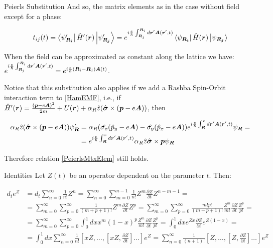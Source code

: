 \begin{subappendices}
\begin{section}{Peierls Substitution}
And so, the matrix elements as in the case without field except for a phase:

\begin{equation}
\label{PeierlsMtxElem}
t_{ij}(t) = \bra{\psi'_{\boldsymbol{R_i}}} \hat{H}'(\boldsymbol{r}) \ket{\psi'_{\boldsymbol{R_j}}} = e^{i\frac{e}{\hbar}\int_{\boldsymbol{R}_j}^{\boldsymbol{R}_i} d\boldsymbol{r}'\boldsymbol{A}(\boldsymbol{r}',t)} \bra{\psi_{\boldsymbol{R_i}}} \hat{H}(\boldsymbol{r}) \ket{\psi_{\boldsymbol{R_j}}}
\end{equation}

When the field can be approximated as constant along the lattice we have: $e^{i\frac{e}{\hbar}\int_{\boldsymbol{R}_j}^{\boldsymbol{R}_i} d\boldsymbol{r}'\boldsymbol{A}(\boldsymbol{r}',t)} = e^{i\frac{e}{\hbar} (\boldsymbol{R}_i-\boldsymbol{R}_j) \boldsymbol{A}(t)}$.

Notice that this substitution also applies if we add a Rashba Spin-Orbit interaction term to \ref{HamEMF}, i.e., if $\hat{H}'(\boldsymbol{r}) = \frac{(\boldsymbol{p}-e\boldsymbol{A})^2}{2m} +U(\boldsymbol{r}) + \alpha_R \hat{z}(\hat{\boldsymbol{\sigma}} \times (\boldsymbol{p}-e\boldsymbol{A}))$, then

\begin{align*}
  \alpha_R \hat{z}(\hat{\boldsymbol{\sigma}} \times (\boldsymbol{p}-e\boldsymbol{A})) \psi'_{\boldsymbol{R}} &= \alpha_R(\hat{\sigma_x}(\hat{p}_y-e\boldsymbol{A}) - \hat{\sigma_y}(\hat{p}_x-e\boldsymbol{A})) e^{i\frac{e}{\hbar}\int_{\boldsymbol{R}}^{\boldsymbol{r}}d\boldsymbol{r}'\boldsymbol{A}(\boldsymbol{r}',t)} \psi_{\boldsymbol{R}} = \\
  &= e^{i\frac{e}{\hbar}\int_{\boldsymbol{R}}^{\boldsymbol{r}}d\boldsymbol{r}'\boldsymbol{A}(\boldsymbol{r}',t)} \alpha_R \hat{z}\hat{\boldsymbol{\sigma}} \times \boldsymbol{p} \psi_{\boldsymbol{R}}
\end{align*}

Therefore relation \ref{PeierlsMtxElem} still holds.

\end{section}

\begin{section}{Identities}
\label{AP3B}
Let $Z(t)$ be an operator dependent on the parameter $t$. Then:

\begin{align*}
d_t e^{Z} &= d_t \sum_{n=0}^\infty \frac{1}{n!} Z^n = \sum_{n=0}^\infty \sum_{m=0}^{n-1} \frac{1}{n!} Z^m \frac{\partial Z}{\partial t} Z^{n-m-1} = \\
&= \sum_{m=0}^\infty \sum_{p=0}^\infty \frac{1}{(m+p+1)!}Z^m \frac{\partial Z}{\partial t} Z^p = \sum_{m=0}^\infty \sum_{p=0}^\infty \frac{m!p!}{(m+p+1)!} \frac{Z^m}{m!} \frac{\partial Z}{\partial t} \frac{Z^p}{p!} =\\
&= \sum_{m=0}^\infty \sum_{p=0}^\infty \int_0^1 dx x^m (1-x)^p \frac{Z^m}{m!} \frac{\partial Z}{\partial t} \frac{Z^p}{p!} = \int_0^1 dx e^{Zx} \frac{\partial Z}{\partial t} e^{Z(1-x)} = \\
&= \int_0^1 dx \sum_{n=0}^\infty \frac{1}{n!} \left[xZ, \dots, \left[xZ, \frac{\partial Z}{\partial t}\right] \dots \right] e^Z = \sum_{n=0}^\infty \frac{1}{(n+1)!} \left[Z, \dots, \left[Z, \frac{\partial Z}{\partial t}\right] \dots \right] e^Z
\end{align*}


\end{section}
\end{subappendices}
